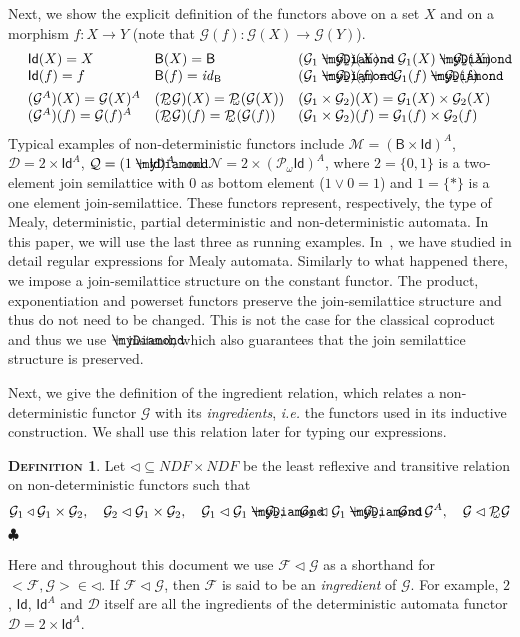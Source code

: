 \documentclass{LMCS}
\newcommand\D{\mathcal{D}}
\newcommand\N{\mathcal{N}}
\newcommand\M{\mathcal{M}}
\newcommand\Pa{\mathcal{Q}}
\def\pow{{\mathcal P_{\!\!\!\omega}}}
\newcommand\ndf{\mathit{NDF}}
\newcommand\id{\mathsf{Id}}
\newcommand\B{\mathsf{B}}
\newcommand\G{\mathcal{G}}
\newcommand\F{\mathcal{F}}
\newcommand{\myplus}{\mathbin{\rlap{$\myDiamond$}\hspace*{.01cm}\raisebox{.14ex}{$+$}}}
\def\hyph{-\penalty0\hskip0pt\relax}
\theoremstyle{definition}
\newtheorem{mydefinition}{\textsc{Definition}}[section]
\theoremstyle{plain}
\theoremstyle{plain}
\theoremstyle{plain}
\theoremstyle{plain}
\theoremstyle{definition}
\theoremstyle{definition}
\newenvironment{definition}{
\begin{mydefinition}}
    {\hfill$\clubsuit$\end{mydefinition}}
\begin{document}
Next, we show the explicit definition of the functors above on a set $X$
and on a morphism $f\colon X\to Y$ (note that $\G(f) \colon \G(X) \to
\G(Y)$).
\[
\begin{array}{lll}
\id(X) = X & \B(X) = \B & (\G_1\myplus \G_2) (X) = \G_1(X)\myplus \G_2(X) \\
\id(f) = f &  \B(f) = \mathit{id}_\B & (\G_1\myplus \G_2) (f) = \G_1(f)
\myplus \G_2 (f) \\[1ex]
 (\G^A)(X) = \G(X)^A & (\pow
\G)(X)
= \pow (\G(X)) & (\G_1\times \G_2) (X) = \G_1(X) \times \G_2(X) \\
 (\G^A)(f) = \G(f)^A & 
(\pow \G)(f) = \pow (\G(f)) & (\G_1\times \G_2) (f) = \G_1(f) \times
\G_2(f)
\\
\end{array}
\]
Typical examples of non\hyph deterministic functors include $\M =
(\B\times \id)^A$,
 $\D = 2 \times \id^A$, $\Pa= (1 \myplus \id)^A$ and $\N= 2
\times (\pow\id)^A $, where $2 = \{0,1\}$ is a two-element join
semilattice with $0$ as bottom element ($1\vee 0 = 1$) and $1=\{*\}$ is a
one element join-semilattice. These
functors represent, respectively, the type  of Mealy,
deterministic, partial deterministic and non\hyph deterministic
automata. 
In this paper, we will use the last three as running examples.
In~\cite{BRS08}, we have studied in detail regular
expressions for Mealy automata. Similarly to what happened there, we
impose a join\hyph semilattice structure on the constant functor. The
product, exponentiation and powerset functors preserve the
join\hyph semilattice structure and thus do not need to be changed.
 This is not the case for the classical coproduct and
thus we use $\myplus$ instead, which also guarantees that the join
semilattice structure is preserved. 

Next, we give the definition of  the ingredient relation, which
relates a non\hyph deterministic functor $\G$ with its {\em
ingredients}, {\em
i.e.} the functors used in its inductive construction. We shall use
this relation later for typing our expressions.

\begin{definition}

Let $\lhd\subseteq \ndf\times \ndf$ be the least reflexive and
transitive relation on
non\hyph deterministic functors
such that
\[
\G_1\triangleleft \G_1\times \G_2,\ \ \ \G_2\lhd \G_1\times \G_2,\ \ \ \G_1\lhd \G_1\myplus \G_2,\ \ \ \G_2\lhd \G_1\myplus \G_2,\ \ \ \G\lhd \G^A,\ \ \ \G\lhd \pow \G
\]
\end{definition}
Here and throughout this document we use $\F \lhd \G$ as a shorthand
for $<\F,\G>\in \lhd$. If $\F \lhd \G$, then $\F$ is said to  be an
\emph{ingredient} of $\G$. For example, $2$, $\id$, $\id^A$ and $\D$
itself are all the ingredients of the deterministic automata functor
$\D=2\times\id^A$.
\end{document}
